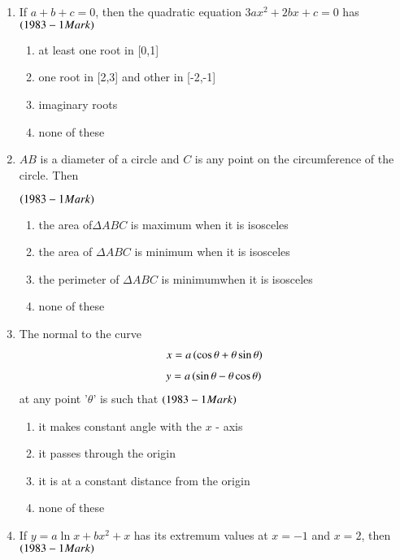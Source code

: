 \documentclass[journal,12pt,twocolumn]{IEEEtran}
\theoremstyle{remark}
\begin{document}
\begin{enumerate}

\item If $a+b+c = 0$, then the quadratic equation $3ax^2 + 2bx + c = 0$
has \hfill$\left(1983 - 1 Mark\right)$
\begin{enumerate}
	\item at least one root in [0,1]
	\item one root in [2,3] and other in [-2,-1]
        \item imaginary roots
	\item none of these
\end{enumerate}

 \item $AB$ is a diameter of a circle and $C$ is any point on the
circumference of the circle. Then

\hfill$\left(1983 - 1 Mark\right)$
\begin{enumerate}
	\item the area of$\Delta ABC$ is maximum when it is isosceles
	\item the area of $\Delta ABC$ is minimum when it is isosceles
	\item the perimeter of $\Delta ABC$ is minimumwhen it is isosceles
	\item none of these
\end{enumerate}

\item The normal to the curve 
\begin{align*}x = a\left(\cos \theta + \theta\sin \theta\right)
\end{align*}
\begin{align*}y = a\left(\sin \theta - \theta\cos \theta\right)
\end{align*}
at any point '$\theta$' is such that \hfill$\left(1983 - 1 Mark\right)$
\begin{enumerate}
	\item it makes  constant angle with the $x$ - axis
	\item it passes through the origin
	\item it is at a constant distance from the origin
	\item none of these\\
\end{enumerate}

\item If $y=a\ln x + bx^2 +x$ has its extremum values at 
$x = -1$ and $x = 2$, then
\hfill$\left(1983 - 1 Mark\right)$

\begin{enumerate}
\end{enumerate}


\end{enumerate}
\end{document}

